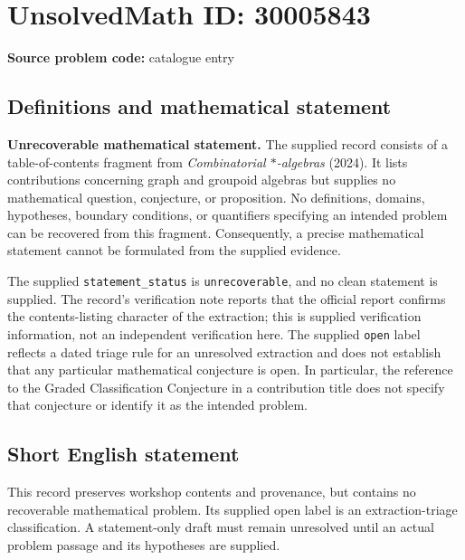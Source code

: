 \documentclass[11pt]{article}
\begin{document}
\section*{UnsolvedMath ID: 30005843}
\textbf{Source problem code:} catalogue entry
\subsection{Definitions and mathematical statement}
\textbf{Unrecoverable mathematical statement.} The supplied record consists of a table-of-contents fragment from \emph{Combinatorial $*$-algebras} (2024). It lists contributions concerning graph and groupoid algebras but supplies no mathematical question, conjecture, or proposition. No definitions, domains, hypotheses, boundary conditions, or quantifiers specifying an intended problem can be recovered from this fragment. Consequently, a precise mathematical statement cannot be formulated from the supplied evidence.

The supplied \texttt{statement\_status} is \texttt{unrecoverable}, and no clean statement is supplied. The record's verification note reports that the official report confirms the contents-listing character of the extraction; this is supplied verification information, not an independent verification here. The supplied \texttt{open} label reflects a dated triage rule for an unresolved extraction and does not establish that any particular mathematical conjecture is open. In particular, the reference to the Graded Classification Conjecture in a contribution title does not specify that conjecture or identify it as the intended problem.
\subsection{Short English statement}
This record preserves workshop contents and provenance, but contains no recoverable mathematical problem. Its supplied open label is an extraction-triage classification. A statement-only draft must remain unresolved until an actual problem passage and its hypotheses are supplied.
\end{document}
